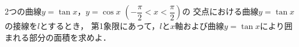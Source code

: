 \documentclass[../../main.tex]{subfiles}
\begin{document}
2つの曲線$y=\tan x$，$y=\cos x$ $\displaystyle\left( -\dfrac{\pi}{2}<x<\dfrac{\pi}{2} \right)$の
交点における曲線$y=\tan x$の接線を$l$とするとき，
第1象限にあって，$l$と$x$軸および曲線$y=\tan x$により囲まれる部分の面積を求めよ．
\end{document}
